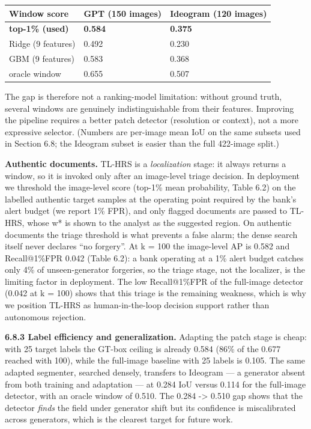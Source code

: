 {\def\LTcaptype{none} %
\begin{longtable}[]{@{}lll@{}}
\toprule\noalign{}
Window score & GPT (150 images) & Ideogram (120 images) \\
\midrule\noalign{}
\endhead
\bottomrule\noalign{}
\endlastfoot
\textbf{top-1\% (used)} & \textbf{0.584} & \textbf{0.375} \\
Ridge (9 features) & 0.492 & 0.230 \\
GBM (9 features) & 0.583 & 0.368 \\
oracle window & 0.655 & 0.507 \\
\end{longtable}
}

The gap is therefore not a ranking-model limitation: without ground truth, several windows are genuinely indistinguishable from their features. Improving the pipeline requires a better patch detector (resolution or context), not a more expressive selector. (Numbers are per-image mean IoU on the same subsets used in Section 6.8; the Ideogram subset is easier than the full 422-image split.)

\textbf{Authentic documents.} TL-HRS is a \emph{localization} stage: it always returns a window, so it is invoked only after an image-level triage decision. In deployment we threshold the image-level score (top-1\% mean probability, Table 6.2) on the labelled authentic target samples at the operating point required by the bank's alert budget (we report 1\% FPR), and only flagged documents are passed to TL-HRS, whose w* is shown to the analyst as the suggested region. On authentic documents the triage threshold is what prevents a false alarm; the dense search itself never declares ``no forgery''. At k = 100 the image-level AP is 0.582 and Recall@1\%FPR 0.042 (Table 6.2): a bank operating at a 1\% alert budget catches only 4\% of unseen-generator forgeries, so the triage stage, not the localizer, is the limiting factor in deployment. The low Recall@1\%FPR of the full-image detector (0.042 at k = 100) shows that this triage is the remaining weakness, which is why we position TL-HRS as human-in-the-loop decision support rather than autonomous rejection.

\textbf{6.8.3 Label efficiency and generalization.} Adapting the patch stage is cheap: with 25 target labels the GT-box ceiling is already 0.584 (86\% of the 0.677 reached with 100), while the full-image baseline with 25 labels is 0.105. The same adapted segmenter, searched densely, transfers to Ideogram --- a generator absent from both training and adaptation --- at 0.284 IoU versus 0.114 for the full-image detector, with an oracle window of 0.510. The 0.284 -\textgreater{} 0.510 gap shows that the detector \emph{finds} the field under generator shift but its confidence is miscalibrated across generators, which is the clearest target for future work.

